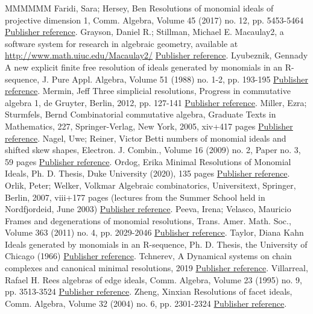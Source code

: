 \begin{thebibliography}{MMMMMM}
 Faridi, Sara; Hersey, Ben Resolutions of monomial ideals of projective dimension 1, Comm. Algebra, Volume 45 (2017) no. 12, pp. 5453-5464 \href{https://alco.centre-mersenne.org/articles/10.5802/alco.325/#FH}{Publisher reference}.
 Grayson, Daniel R.; Stillman, Michael E. Macaulay2, a software system for research in algebraic geometry, available at \url{http://www.math.uiuc.edu/Macaulay2/} \href{https://alco.centre-mersenne.org/articles/10.5802/alco.325/#M2}{Publisher reference}.
 Lyubeznik, Gennady A new explicit finite free resolution of ideals generated by monomials in an R-sequence, J. Pure Appl. Algebra, Volume 51 (1988) no. 1-2, pp. 193-195 \href{https://alco.centre-mersenne.org/articles/10.5802/alco.325/#L}{Publisher reference}.
 Mermin, Jeff Three simplicial resolutions, Progress in commutative algebra 1, de Gruyter, Berlin, 2012, pp. 127-141 \href{https://alco.centre-mersenne.org/articles/10.5802/alco.325/#M}{Publisher reference}.
 Miller, Ezra; Sturmfels, Bernd Combinatorial commutative algebra, Graduate Texts in Mathematics, 227, Springer-Verlag, New York, 2005, xiv+417 pages \href{https://alco.centre-mersenne.org/articles/10.5802/alco.325/#MS}{Publisher reference}.
 Nagel, Uwe; Reiner, Victor Betti numbers of monomial ideals and shifted skew shapes, Electron. J. Combin., Volume 16 (2009) no. 2, Paper no. 3, 59 pages \href{https://alco.centre-mersenne.org/articles/10.5802/alco.325/#NR}{Publisher reference}.
 Ordog, Erika Minimal Resolutions of Monomial Ideals, Ph. D. Thesis, Duke University (2020), 135 pages \href{https://alco.centre-mersenne.org/articles/10.5802/alco.325/#EMO}{Publisher reference}.
 Orlik, Peter; Welker, Volkmar Algebraic combinatorics, Universitext, Springer, Berlin, 2007, viii+177 pages (lectures from the Summer School held in Nordfjordeid, June 2003) \href{https://alco.centre-mersenne.org/articles/10.5802/alco.325/#OW}{Publisher reference}.
 Peeva, Irena; Velasco, Mauricio Frames and degenerations of monomial resolutions, Trans. Amer. Math. Soc., Volume 363 (2011) no. 4, pp. 2029-2046 \href{https://alco.centre-mersenne.org/articles/10.5802/alco.325/#PV}{Publisher reference}.
 Taylor, Diana Kahn Ideals generated by monomials in an R-sequence, Ph. D. Thesis, the University of Chicago (1966) \href{https://alco.centre-mersenne.org/articles/10.5802/alco.325/#T}{Publisher reference}.
 Tchnerev, A Dynamical systems on chain complexes and canonical minimal resolutions, 2019 \href{https://alco.centre-mersenne.org/articles/10.5802/alco.325/#Tch}{Publisher reference}.
 Villarreal, Rafael H. Rees algebras of edge ideals, Comm. Algebra, Volume 23 (1995) no. 9, pp. 3513-3524 \href{https://alco.centre-mersenne.org/articles/10.5802/alco.325/#villa}{Publisher reference}.
 Zheng, Xinxian Resolutions of facet ideals, Comm. Algebra, Volume 32 (2004) no. 6, pp. 2301-2324 \href{https://alco.centre-mersenne.org/articles/10.5802/alco.325/#Z}{Publisher reference}.
\end{thebibliography}
